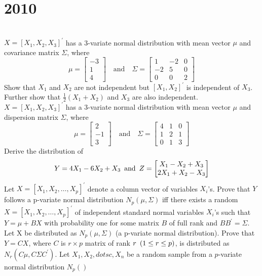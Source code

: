 \section*{2010}
\vspace{-.5cm}
\hrulefill \smallskip\\
 $X = [X_1,X_2,X_3]^\prime$ has a 3-variate normal distribution with mean vector $\mu$ and covariance matrix $\Sigma$, where
\[ \mu = \begin{bmatrix}
        -3 \\ 1 \\ 4 \end{bmatrix}
    \quad \text{and} \quad
    \Sigma = \begin{bmatrix}
            1  & -2 & 0 \\
            -2 &  5 & 0 \\
            0  &  0 & 2
            \end{bmatrix}
\] Show that $X_1$ and $X_2$ are not independent but $[X_1,X_2]^\prime$ is independent of $X_3$. Further show that $\displaystyle \frac{1}{2}(X_1 + X_2)$ and $X_3$ are also independent.
\myline 
{} $X = [X_1,X_2,X_3]^\prime$ has a 3-variate normal distribution with mean vector $\mu$ and dispersion matrix $\Sigma$, where
\[ \mu = \begin{bmatrix}
        2 \\ -1 \\ 3 \end{bmatrix}
    \quad \text{and} \quad
    \Sigma = \begin{bmatrix}
            4 & 1 & 0 \\
            1 & 2 & 1 \\
            0 & 1 & 3
            \end{bmatrix}
\]
Derive the distribution of 
\[ Y = 4X_1 - 6X_2 + X_3 \enskip \text{and} \enskip 
Z = \begin{bmatrix}
    X_1 - X_2 + X_3 \\ 2X_1 + X_2 - X_3
    \end{bmatrix}\]
 Let $X = [X_1,X_2,\dotsc,X_p]^\prime$ denote a column vector of variables $X_i$'s. Prove that $Y$ follows a p-variate normal distribution $N_p(\mu,\Sigma)$ iff there exists a random $X = [X_1,X_2,\dotsc,X_p]^\prime$ of independent standard normal variables $X_i$'s such that $Y = \mu + BX$ with probability one for some matrix $B$ of full rank and $BB^\prime = \Sigma.$
\myline
{} Let X be distributed as $N_p(\mu,\Sigma)$ (a p-variate normal distribution). Prove that $Y =CX$, where $C$ is $r \times p$ matrix of rank $r \enskip (1 \leq r \leq p)$, is distributed as $N_r(C\mu, C\Sigma C^\prime)$.
\myline
{} Let $X_1,X_2,dotsc,X_n$ be a random sample from a $p$-variate normal distribution $N_p()$